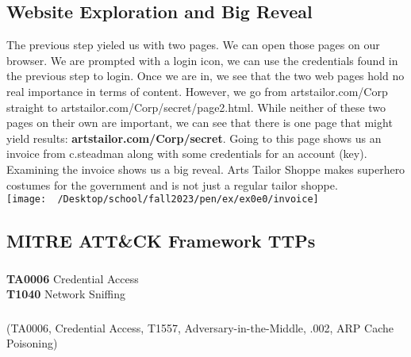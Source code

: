 \documentclass[notitlepage]{article}
\begin{document}
    \subsection{Website Exploration and Big Reveal}
    The previous step yieled us with two pages. We can open those pages on our browser. We are prompted with a login icon, we can use the credentials found in the previous step to login. Once we are
    in, we see that the two web pages hold no real importance in terms of content. However, we go from artstailor.com/Corp straight to artstailor.com/Corp/secret/page2.html. While neither of these two 
    pages on their own are important, we can see that there is one page that might yield results: \textbf{artstailor.com/Corp/secret}. Going to this page shows us an invoice from
    c.steadman along with some credentials for an account (key). Examining the invoice shows us a big reveal. Arts Tailor Shoppe makes superhero costumes for the government and is not just a regular 
    tailor shoppe. \\
\texttt{[image: ~/Desktop/school/fall2023/pen/ex/ex0e0/invoice]} \\


    \subsection{MITRE ATT{\&}CK Framework TTPs}
    
	
	\subsubsection*{}
    \indent\textbf{TA0006} Credential Access \\
    \indent\indent\textbf{T1040} Network Sniffing \\
	
	\subsubsection*{}
    \ttp(TA0006, Credential Access, T1557, Adversary-in-the-Middle, .002, ARP Cache Poisoning) 
\end{document}
